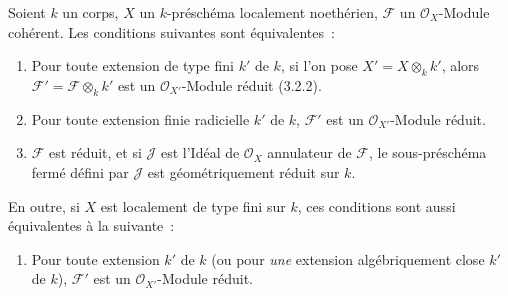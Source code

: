 \begin{proposition}[4.6.16]
\label{IV.2.4.6.16-fr}
Soient $k$ un corps, $X$ un $k$-préschéma localement noethérien, $\mathscr F$
un $\mathcal O_X$-Module cohérent. Les conditions suivantes sont
équivalentes~:
\begin{enumerate}
\item[\textup{a)}] Pour toute extension de type fini $k'$ de $k$, si l'on pose
$X'=X\otimes_k k'$, alors $\mathscr F'=\mathscr F\otimes_k k'$ est un
$\mathcal O_{X'}$-Module réduit \textup{(3.2.2)}.
\item[\textup{b)}] Pour toute extension finie radicielle $k'$ de $k$, $\mathscr F'$ est
un $\mathcal O_{X'}$-Module réduit.
\item[\textup{c)}] $\mathscr F$ est réduit, et si $\mathscr J$ est l'Idéal de
$\mathcal O_X$ annulateur de $\mathscr F$, le sous-préschéma fermé défini par
$\mathscr J$ est géométriquement réduit sur $k$.
\end{enumerate}


En outre, si $X$ est localement de type fini sur $k$, ces conditions sont aussi
équivalentes à la suivante~:
\begin{enumerate}
\item[\textup{d)}] Pour toute extension $k'$ de $k$ \textup{(ou} pour \emph{une} extension
algébriquement close $k'$ de $k$), $\mathscr F'$ est un
$\mathcal O_{X'}$-Module réduit.
\end{enumerate}
\end{proposition}

